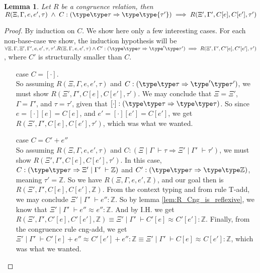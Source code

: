 \documentclass[twoside,11pt,openright]{report}
\newtheorem{lemma}[theorem]{Lemma}
\theoremstyle{definition}
\newcommand{\expr}{e}
\newcommand{\empctx}{[\cdot]}
\newcommand{\ctx}{C}
\newcommand{\Tint}{\mathbb{Z}}
\newcommand{\typ}{\tau}
\newcommand{\venv}{\Gamma}
\newcommand{\tenv}{\Xi}
\newcommand{\jdg}[4]{#1 \; | \; #2 \; \vdash #3 : #4}
\newcommand{\jdgType}[3]{#1 \; | \; #2 \; \vdash #3}
\def\envstyp#1#2\type#3{\jdgType{#1}{#2}{#3}} %
\newcommand{\jdgRel}[6]{#1 \; | \; #2 \; \vdash #3 \approx^{#4} #5 : #6}
\begin{document}
\begin{lemma}\label{lem:CE_eq_part2_helper}
  Let $R$ be a congruence relation, then $R(\tenv, \venv, \expr, \expr', \typ) \; \land \; \ctx:(\envstyp \tenv \venv \type \typ \Rightarrow \envstyp {\tenv'} {\venv'} \type {\typ'}) \implies R(\tenv', \venv', C[\expr], C[\expr'], \typ')$
\end{lemma}
\begin{proof}
  By induction on $\ctx$. We show here only a few interesting cases.
  For each non-base-case we show, the induction hypothesis will be $\forall \tenv, \venv, \tenv', \venv', \expr, \expr', \typ, \typ' .\\ R(\tenv, \venv, \expr, \expr', \typ) \land \ctx' : (\envstyp \tenv \venv \type \typ \Rightarrow \envstyp {\tenv'} \venv' \type \typ') \implies R(\tenv', \venv', \ctx'[\expr], \ctx'[\expr'], \typ')$, where $\ctx'$ is structurally smaller than $\ctx$.
  \begin{itemize}
    \item[case] $\ctx = \empctx$.\\
      So assuming $R(\tenv, \venv, \expr, \expr', \typ)$ and $\ctx: (\envstyp \tenv \venv \type \typ \Rightarrow \envstyp {\tenv'} \venv' \type \typ')$, we must show $R(\tenv', \venv', \ctx[\expr], \ctx[\expr'], \typ')$. We may conclude that $\tenv = \tenv'$, $\venv = \venv'$, and $\typ = \typ'$, given that $\empctx : (\envstyp \tenv \venv \type \typ \Rightarrow \envstyp \tenv \venv \type \typ)$. So since $\expr = \empctx[\expr] = \ctx[\expr]$, and $\expr' = \empctx[\expr'] = \ctx[\expr']$, we get $R(\tenv', \venv', \ctx[\expr], \ctx[\expr'], \typ')$, which was what we wanted.
    \item[case] $\ctx = \ctx' + \expr''$\\
      So assuming $R(\tenv, \venv, \expr, \expr', \typ)$ and $\ctx : (\jdgType{\tenv}{\venv}{\typ} \Rightarrow \jdgType{\tenv'}{\venv'}{\typ'})$, we must show $R(\tenv', \venv', \ctx[\expr], \ctx[\expr'], \typ')$. In this case, $\ctx : (\envstyp \tenv \venv \type \typ \Rightarrow \jdgType{\tenv'}{\venv'}{\Tint})$ and $\ctx' : (\envstyp \tenv \venv \type \typ \Rightarrow \envstyp \tenv \venv \type \Tint)$, meaning $\typ' = \Tint$. So we have $R(\tenv, \venv, \expr, \expr', \Tint)$, and our goal then is $R(\tenv', \venv', \ctx[\expr], \ctx[\expr'], \Tint)$. From the context typing and from rule T-add, we may conclude $\jdg{\tenv'}{\venv'}{\expr''}{\Tint}$. So by lemma \ref{lem:R_Cng_is_reflexive}, we know that $\jdgRel{\tenv'}{\venv'}{\expr''}{}{\expr''}{\Tint}$. And by I.H. we get $R(\tenv', \venv', \ctx'[\expr], \ctx'[\expr'], \Tint) \equiv \jdgRel{\tenv'}{\venv'}{\ctx'[\expr]}{}{\ctx'[\expr']}{\Tint}$. Finally, from the congruence rule cng-add, we get $\jdgRel{\tenv'}{\venv'}{\ctx'[\expr] + \expr''}{}{\ctx'[\expr'] + \expr''}{\Tint} \equiv \jdgRel{\tenv'}{\venv'}{\ctx[\expr]}{}{\ctx[\expr']}{\Tint}$, which was what we wanted.

\end{itemize}
\end{proof}
\end{document}

